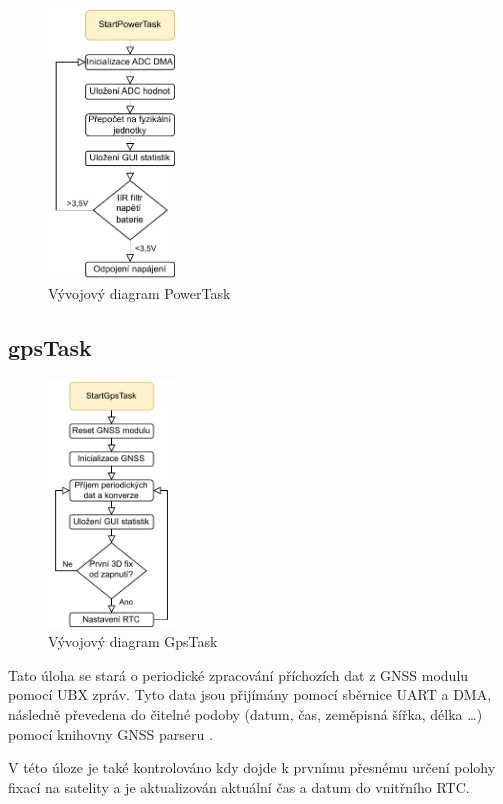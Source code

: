 \begin{figure}[h]
    \centering
    \includegraphics[width=0.3\textwidth]{obrazky/PowerTask}
    \caption{Vývojový diagram PowerTask}
\end{figure}
\subsection{gpsTask}
\begin{figure}[h]
    \centering
    \includegraphics[width=0.3\textwidth]{obrazky/GpsTask}
    \caption{Vývojový diagram GpsTask}
\end{figure}
Tato úloha se stará o periodické zpracování příchozích dat z GNSS modulu pomocí \ac{UBX} zpráv. Tyto data jsou přijímány pomocí sběrnice \ac{UART} a DMA, následně převedena do čitelné podoby (datum, čas, zeměpisná šířka, délka \ldots) pomocí knihovny GNSS parseru \cite{SimpleMethod2021}.

V této úloze je také kontrolováno kdy dojde k prvnímu přesnému určení polohy fixací na satelity a je aktualizován aktuální čas a datum do vnitřního \ac{RTC}.

